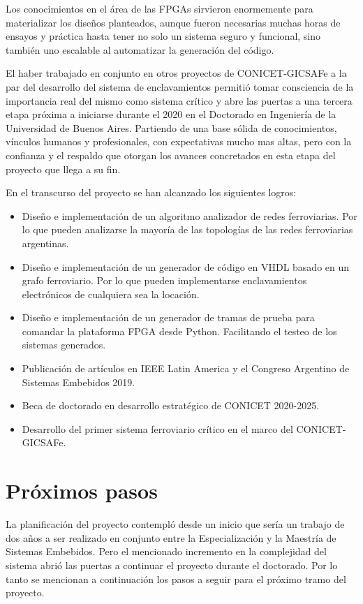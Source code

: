	Los conocimientos en el área de las FPGAs sirvieron enormemente para materializar los diseños planteados, aunque fueron necesarias muchas horas de ensayos y práctica hasta tener no solo un sistema seguro y funcional, sino también uno escalable al automatizar la generación del código.
	
	El haber trabajado en conjunto en otros proyectos de CONICET-GICSAFe a la par del desarrollo del sistema de enclavamientos permitió tomar consciencia de la importancia real del mismo como sistema crítico y abre las puertas a una tercera etapa próxima a iniciarse durante el 2020 en el Doctorado en Ingeniería de la Universidad de Buenos Aires. Partiendo de una base sólida de conocimientos, vínculos humanos y profesionales, con expectativas mucho mas altas, pero con la confianza y el respaldo que otorgan los avances concretados en esta etapa del proyecto que llega a su fin.

	En el transcurso del proyecto se han alcanzado los siguientes logros:
	
	\begin{itemize}
		\item Diseño e implementación de un algoritmo analizador de redes ferroviarias. Por lo que pueden analizarse la mayoría de las topologías de las redes ferroviarias argentinas.
		\item Diseño e implementación de un generador de código en VHDL basado en un grafo ferroviario. Por lo que pueden implementarse enclavamientos electrónicos de cualquiera sea la locación.
		\item Diseño e implementación de un generador de tramas de prueba para comandar la plataforma FPGA desde Python. Facilitando el testeo de los sistemas generados.
		\item Publicación de artículos en IEEE Latin America y el Congreso Argentino de Sistemas Embebidos 2019.
		\item Beca de doctorado en desarrollo estratégico de CONICET 2020-2025.
		\item Desarrollo del primer sistema ferroviario crítico en el marco del CONICET-GICSAFe.
	\end{itemize}
	
\section{Próximos pasos}

	La planificación del proyecto contempló desde un inicio que sería un trabajo de dos años a ser realizado en conjunto entre la Especialización y la Maestría de Sistemas Embebidos. Pero el mencionado incremento en la complejidad del sistema abrió las puertas a continuar el proyecto durante el doctorado. Por lo tanto se mencionan a continuación los pasos a seguir para el próximo tramo del proyecto.	
	
